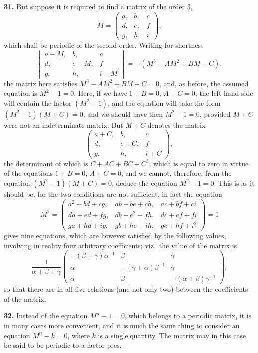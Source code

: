 \documentclass[11pt,a4paper]{book}
\begin{document}
\begin{center}
\medskip
\noindent\textbf{31.} But suppose it is required to find a matrix of the order 3,
\[
M = \begin{pmatrix} a, & b, & c \\ d, & e, & f \\ g, & h, & i \end{pmatrix},
\]
which shall be periodic of the second order. Writing for shortness
\[
\begin{vmatrix} a-M, & b, & c \\ d, & e-M, & f \\ g, & h, & i-M \end{vmatrix}
= -(M^3 - AM^2 + BM - C),
\]
the matrix here satisfies $M^3 - AM^2 + BM - C = 0$, and, as before, the assumed equation is $M^2 - 1 = 0$. Here, if we have $1+B=0$, $A+C=0$, the left-hand side will contain the factor $(M^2-1)$, and the equation will take the form $(M^2-1)(M+C)=0$, and we should have then $M^2-1=0$, provided $M+C$ were not an indeterminate matrix. But $M+C$ denotes the matrix
\[
\begin{pmatrix} a+C, & b, & c \\ d, & e+C, & f \\ g, & h, & i+C \end{pmatrix},
\]
the determinant of which is $C+AC+BC+C^3$, which is equal to zero in virtue of the equations $1+B=0$, $A+C=0$, and we cannot, therefore, from the equation $(M^2-1)(M+C)=0$, deduce the equation $M^2-1=0$. This is as it should be, for the two conditions are not sufficient, in fact the equation
\[
M^2 = \begin{pmatrix}
a^2+bd+cg, & ab+be+ch, & ac+bf+ci \\
da+ed+fg, & db+e^2+fh, & dc+ef+fi \\
ga+hd+ig, & gb+he+ih, & gc+hf+i^2
\end{pmatrix} = 1
\]
gives nine equations, which are however satisfied by the following values, involving in reality four arbitrary coefficients; viz.\ the value of the matrix is
\[
\frac{1}{\alpha+\beta+\gamma}
\begin{pmatrix}
-(\beta+\gamma)\alpha^{-1} & \beta & \gamma \\
\alpha & -(\gamma+\alpha)\beta^{-1} & \gamma \\
\alpha & \beta & -(\alpha+\beta)\gamma^{-1}
\end{pmatrix},
\]
so that there are in all five relations (and not only two) between the coefficients of the matrix.

\medskip
\noindent\textbf{32.} Instead of the equation $M^n-1=0$, which belongs to a periodic matrix, it is in many cases more convenient, and it is much the same thing to consider an equation $M^n-k=0$, where $k$ is a single quantity. The matrix may in this case be said to be periodic to a factor pres.


\end{center}
\end{document}
